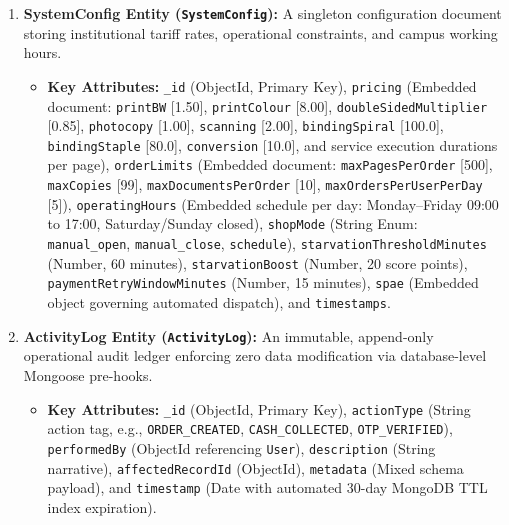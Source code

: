 \documentclass[12pt,a4paper]{report}
\begin{document}
\begin{enumerate}[leftmargin=0.35in, itemsep=4pt]
  \item \textbf{SystemConfig Entity (\texttt{SystemConfig}):}
  A singleton configuration document storing institutional tariff rates, operational constraints, and campus working hours.
  \begin{itemize}[leftmargin=0.25in, itemsep=2pt]
    \item \textbf{Key Attributes:} \texttt{\_id} (ObjectId, Primary Key), \texttt{pricing} (Embedded document: \texttt{printBW} [1.50], \texttt{printColour} [8.00], \texttt{doubleSidedMultiplier} [0.85], \texttt{photocopy} [1.00], \texttt{scanning} [2.00], \texttt{bindingSpiral} [100.0], \texttt{bindingStaple} [80.0], \texttt{conversion} [10.0], and service execution durations per page), \texttt{orderLimits} (Embedded document: \texttt{maxPagesPerOrder} [500], \texttt{maxCopies} [99], \texttt{maxDocumentsPerOrder} [10], \texttt{maxOrdersPerUserPerDay} [5]), \texttt{operatingHours} (Embedded schedule per day: Monday--Friday 09:00 to 17:00, Saturday/Sunday closed), \texttt{shopMode} (String Enum: \texttt{manual\_open}, \texttt{manual\_close}, \texttt{schedule}), \texttt{starvationThresholdMinutes} (Number, 60 minutes), \texttt{starvationBoost} (Number, 20 score points), \texttt{paymentRetryWindowMinutes} (Number, 15 minutes), \texttt{spae} (Embedded object governing automated dispatch), and \texttt{timestamps}.
  \end{itemize}

  \item \textbf{ActivityLog Entity (\texttt{ActivityLog}):}
  An immutable, append-only operational audit ledger enforcing zero data modification via database-level Mongoose pre-hooks.
  \begin{itemize}[leftmargin=0.25in, itemsep=2pt]
    \item \textbf{Key Attributes:} \texttt{\_id} (ObjectId, Primary Key), \texttt{actionType} (String action tag, e.g., \texttt{ORDER\_CREATED}, \texttt{CASH\_COLLECTED}, \texttt{OTP\_VERIFIED}), \texttt{performedBy} (ObjectId referencing \texttt{User}), \texttt{description} (String narrative), \texttt{affectedRecordId} (ObjectId), \texttt{metadata} (Mixed schema payload), and \texttt{timestamp} (Date with automated 30-day MongoDB TTL index expiration).
  \end{itemize}
\end{enumerate}
\end{document}
